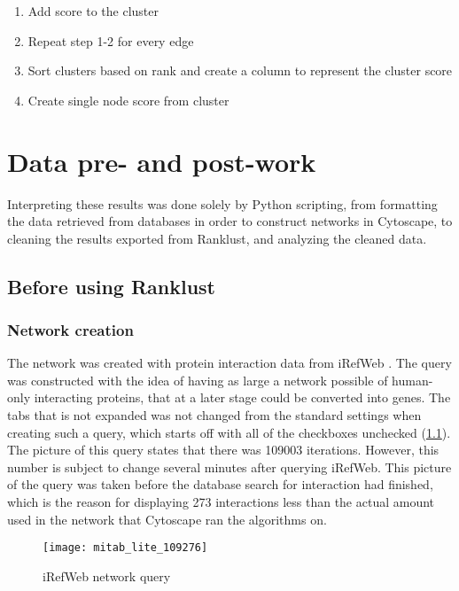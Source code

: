 \begin{enumerate}
    \item Add score to the cluster
    \item Repeat step 1-2 for every edge
    \item Sort clusters based on rank and create a column to represent the
        cluster score
    \item Create single node score from cluster
\end{enumerate}

\chapter{Data pre- and post-work}
Interpreting these results was done solely by Python scripting, from formatting
the data retrieved from databases in order to construct networks in Cytoscape,
to cleaning the results exported from Ranklust, and analyzing the cleaned data. 

\section{Before using Ranklust}
\subsection{Network creation}
The network was created with protein interaction data from iRefWeb
\cite{irefweb}. The query was constructed with the idea of having as large
a network possible of human-only interacting proteins, that at a later stage
could be converted into genes. The tabs that is not expanded was not changed
from the standard settings when creating such a query, which starts off with all
of the checkboxes unchecked (\ref{fig:irefweb}). The picture of this query
states that there was 109003 iterations. However, this number is subject to
change several minutes after querying iRefWeb. This picture of the query was
taken before the database search for interaction had finished, which is the
reason for displaying 273 interactions less than the actual amount used in the
network that Cytoscape ran the algorithms on.
\begin{figure}
    \centering
    \label{fig:irefweb}
    \texttt{[image: mitab\_lite\_109276]}
    \caption{iRefWeb network query}
\end{figure}

